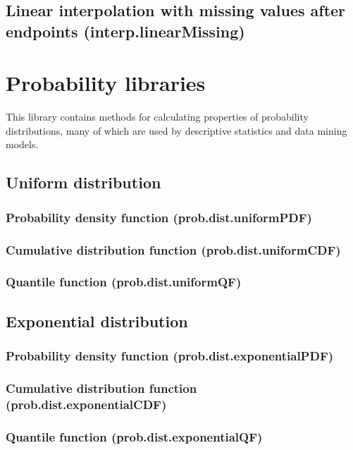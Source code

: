 \documentclass{article}
\theoremstyle{definition}
\begin{document}
\subsection{Linear interpolation with missing values after endpoints (interp.linearMissing)}

\pagebreak

\section{Probability libraries}

This library contains methods for calculating properties of probability distributions, many of which are used by descriptive statistics and data mining models.

\subsection{Uniform distribution}
\subsubsection{Probability density function (prob.dist.uniformPDF)}
\subsubsection{Cumulative distribution function (prob.dist.uniformCDF)}
\subsubsection{Quantile function (prob.dist.uniformQF)}

\subsection{Exponential distribution}
\subsubsection{Probability density function (prob.dist.exponentialPDF)}
\subsubsection{Cumulative distribution function (prob.dist.exponentialCDF)}
\subsubsection{Quantile function (prob.dist.exponentialQF)}
\end{document}
